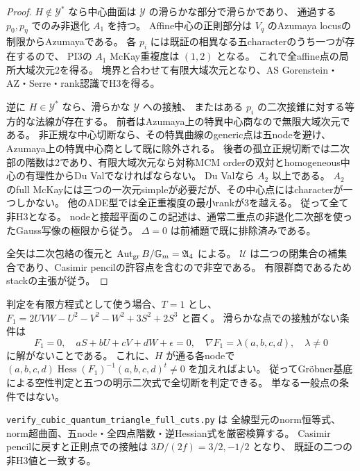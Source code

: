 \begin{proof}
$H\notin\mathcal Y^*$ なら中心曲面は $\mathcal Y$ の滑らかな部分で滑らかであり、
通過する $p_0,p_\eta$ でのみ非退化 $A_1$ を持つ。
Affine中心の正則部分は $V_q$ のAzumaya locusの制限からAzumayaである。
各 $p_i$ には既証の相異なる五characterのうち一つが存在するので、
PI3の $A_1$ McKay重複度は $(1,2)$ となる。
これで全affine点の局所大域次元2を得る。
境界と合わせて有限大域次元となり、AS Gorenstein・AZ・Serre・rank認識でH3を得る。

逆に $H\in\mathcal Y^*$ なら、滑らかな $\mathcal Y$ への接触、
またはある $p_i$ の二次接錐に対する等方的な法線が存在する。
前者はAzumaya上の特異中心商なので無限大域次元である。
非正規な中心切断なら、その特異曲線のgeneric点は五nodeを避け、Azumaya上の特異中心商として既に除外される。
後者の孤立正規切断では二次部の階数は2であり、有限大域次元なら対称MCM orderの双対とhomogeneous中心の有理性からDu Valでなければならない。
Du Valなら $A_2$ 以上である。
$A_2$ のfull McKayには三つの一次元simpleが必要だが、その中心点にはcharacterが一つしかない。
他のADE型では全正重複度の最小rankが3を越える。
従って全て非H3となる。
nodeと接超平面のこの記述は、通常二重点の非退化二次部を使ったGauss写像の極限から従う。
$\Delta=0$ は前補題で既に排除済みである。

全矢は二次包絡の復元と $\operatorname{Aut}_{\rm gr}B/\mathbb G_m=\mathfrak A_4$ による。
$\mathcal U$ は二つの閉集合の補集合であり、Casimir pencilの許容点を含むので非空である。
有限群商であるためstackの主張が従う。
\end{proof}

判定を有限方程式として使う場合、$T=1$ とし、
$F_1=2UVW-U^2-V^2-W^2+3S^2+2S^3$ と置く。
滑らかな点での接触がない条件は
\[
 F_1=0,\quad aS+bU+cV+dW+\epsilon=0,\quad
 \nabla F_1=\lambda(a,b,c,d),\quad\lambda\ne0
\]
に解がないことである。
これに、$H$ が通る各nodeで
$(a,b,c,d)\operatorname{Hess}(F_1)^{-1}(a,b,c,d)^t\ne0$ を加えればよい。
従ってGr\"obner基底による空性判定と五つの明示二次式で全切断を判定できる。
単なる一般点の条件ではない。

\texttt{verify\_cubic\_quantum\_triangle\_\allowbreak full\_cuts.py} は
全線型元のnorm恒等式、norm超曲面、五node・全四点階数・逆Hessian式を厳密検算する。
Casimir pencilに戻すと正則点での接触は $3D/(2f)=3/2,-1/2$ となり、
既証の二つの非H3値と一致する。

